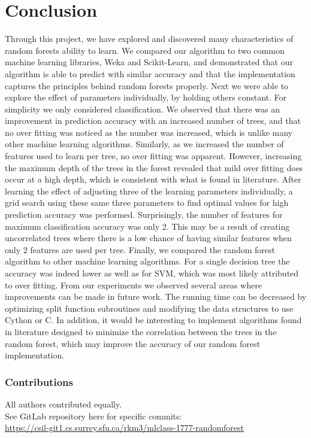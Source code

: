 \documentclass{article} %
\begin{document}
\section{Conclusion}

Through this project, we have explored and discovered many characteristics of random forests ability to learn.
We compared our algorithm to two common machine learning libraries, Weka and Scikit-Learn, and demonstrated that our algorithm is able to predict with similar accuracy and that the implementation captures the principles behind random forests properly.
Next we were able to explore the effect of parameters individually, by holding others constant.
For simplicity we only considered classification.
We observed that there was an improvement in prediction accuracy with an increased number of trees, and that no over fitting was noticed as the number was increased, which is unlike many other machine learning algorithms.
Similarly, as we increased the number of features used to learn per tree, no over fitting was apparent.
However, increasing the maximum depth of the trees in the forest revealed that mild over fitting does occur at a high depth, which is consistent with what is found in literature.
After learning the effect of adjusting three of the learning parameters individually, a grid search using these same three parameters to find optimal values for high prediction accuracy was performed.
Surprisingly, the number of features for maximum classification accuracy was only 2.
This may be a result of creating uncorrelated trees where there is a low chance of having similar features when only 2 features are used per tree.
Finally, we compared the random forest algorithm to other machine learning algorithms.
For a single decision tree the accuracy was indeed lower as well as for SVM, which was most likely attributed to over fitting.
From our experiments we observed several areas where improvements can be made in future work.
The running time can be decreased by optimizing split function subroutines and modifying the data structures to use Cython or C.
In addition, it would be interesting to implement algorithms found in literature designed to minimize the correlation between the trees in the random forest, which may improve the accuracy of our random forest implementation.

\subsubsection*{Contributions}
All authors contributed equally.\\
See GitLab repository here for specific commits:\\
\href{
    https://csil-git1.cs.surrey.sfu.ca/rkm3/mlclass-1777-randomforest
}{
    https://csil-git1.cs.surrey.sfu.ca/rkm3/mlclass-1777-randomforest
}


\small{


}
\end{document}
